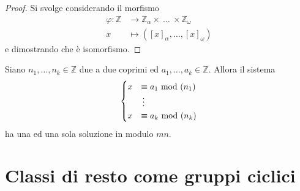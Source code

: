 \begin{proof}
	Si svolge considerando il morfismo
	\begin{align*}
	\varphi:\mathbb{Z}&\longrightarrow\mathbb{Z}_{\alpha}\times\ \dots \ \times\mathbb{Z}_{\omega}\\
	x&\longmapsto\left([x]_{\alpha},\dots,[x]_{\omega}\right)
	\end{align*}
	e dimostrando che è isomorfismo.
\end{proof}
\begin{teorema}
	Siano $n_1,\dots,n_k\in\mathbb{Z}$ due a due coprimi ed $a_1,\dots,a_k\in\mathbb{Z}$. Allora il sistema 
	\begin{equation*}
	\begin{cases}
	x&\equiv a_1\ \mathrm{mod}\ (n_1)\\
	&\,\vdots\\
	x&\equiv a_k\ \mathrm{mod}\ (n_k)
	\end{cases}
	\end{equation*}
	ha una ed una sola soluzione in modulo $mn$.
\end{teorema}




\section{Classi di resto come gruppi ciclici}
